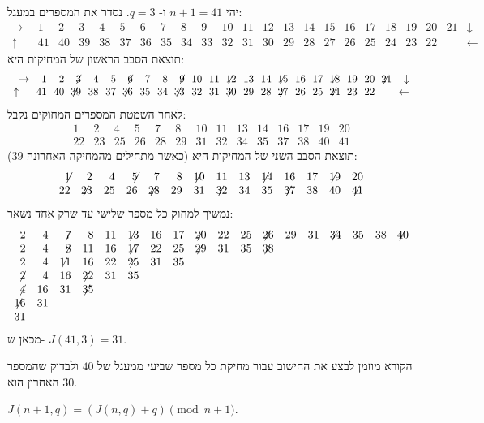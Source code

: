 \begin{example}
יהי
$n+1=41$
ו-%
$q=3$.
נסדר את המספרים במעגל:
\[
\begin{array}{rrrrrrrrrrrrrrrrrrrrrrr}
\rightarrow\!&\!1\!&\!2\!&\!3\!&\!4\!&\!5\!&\!6\!&\!7\!&\!8\!&\!9\!&\!10\!&\!
           11\!&\!12\!&\!13\!&\!14\!&\!15\!&\!16\!&\!17\!&\!18\!&\!19\!&\!20\!&\!21\!&\!
\downarrow\\
\uparrow\quad\!&\!41\!&\!40\!&\!39\!&\!38\!&\!37\!&\!36\!&\!35\!&\!34\!&\!33\!&\!
32\!&\!31\!&\!30\!&\!29\!&\!28\!&\!27\!&\!26\!&\!25\!&\!24\!&\!23\!&\!22\!&\!
&\leftarrow
\end{array}
\]
תוצאת הסבב הראשון של המחיקות היא:
\[
\begin{array}{rrrrrrrrrrrrrrrrrrrrrrr}
\rightarrow\!&\!1\!&\!2\!&\!\not\! 3\!&\!4\!&\!5\!&\!\not\! 6\!&\!7\!&\!8\!&\!\not\! 9\!&\!10\!&\!
           11\!&\!\not\!\! 12\!&\!13\!&\!14\!&\!\not\!\! 15\!&\!16\!&\!17\!&\!\not\!\! 18\!&\!19\!&\!20\!&\!\not\!\! 21\!&\!
\downarrow\\
	\uparrow\quad\!&\!41\!&\!40\!&\!\not\!\! 39\!&\!38\!&\!37\!&\!\not\!\! 36\!&\!35\!&\!34\!&\!\not\!\! 33\!&\!
32\!&\!31\!&\!\not\!\! 30\!&\!29\!&\!28\!&\!\not\!\! 27\!&\!26\!&\!25\!&\!\not\!\! 24\!&\!23\!&\!22\!&\!
\!&\!\leftarrow
\end{array}
\]
לאחר השמטת המספרים המחוקים נקבל:
\[
\begin{array}{rrrrrrrrrrrrrrrrrrrrrrrrrrrr}
1&2&4&5&7&8&10&11&13&14&16&17&19&20\\
22&23&25&26&28&29&31&32&34&35&37&38&40&41
\end{array}
\]
תוצאת הסבב השני של המחיקות היא (כאשר מתחילים מהמחיקה האחרונה
$39$):
\[
\begin{array}{rrrrrrrrrrrrrrrrrrrrrrrrrrrr}
\not\!\! 1&2&4&\not\!\! 5&7&8&\not\!\! 10&11&13&\not\!\! 14&16&17&\not\!\! 19&20\\
22&\not\!\! 23&25&26&\not\!\! 28&29&31&\not\!\! 32&34&35&\not\!\! 37&38&40&\not\!\! 41
\end{array}
\]
נמשיך למחוק כל מספר שלישי עד שרק אחד נשאר:
\[
\begin{array}{rrrrrrrrrrrrrrrrrr}
2&4&\not\!7&8&11&\not\!\!13&16&17&\not\!\!20&22&25&\not\!\!26&29&31&\not\!\!34&35&38&\not\!\!40
\\
2&4&\not\!8&11&16&\not\!\!17&22&25&\not\!\!29&31&35&\not\!\!38
\\
2&4&\not\!\!11&16&22&\not\!\!25&31&35
\\
\not\!2&4&16&\not\!\!22&31&35
\\
\not\!4&16&31&\not\!\!35
\\
\not\!\!16&31
\\
31
\end{array}
\]
מכאן ש-%
$J(41,3)=31$.
\end{example}
הקורא מוזמן לבצע את החישוב עבור מחיקת כל מספר שביעי ממעגל של 
$40$
ולבדוק שהמספר האחרון הוא
$30$.
\begin{theorem}\label{thm.jo1}
$J(n+1,q)=(J(n,q)+q) \pmod {n+1}$.
\end{theorem}


